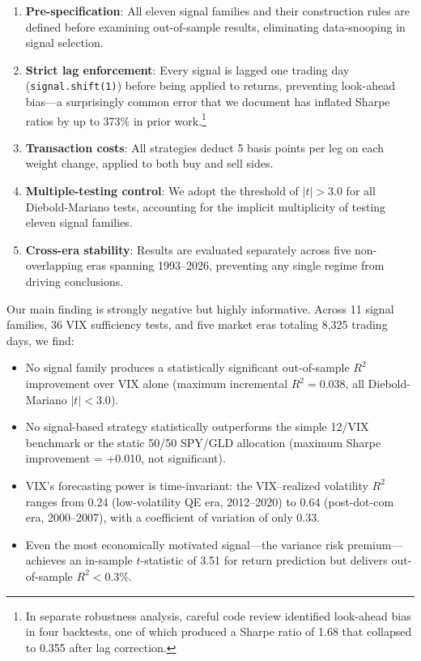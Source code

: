 \documentclass[12pt,a4paper]{article}
\begin{document}
\begin{enumerate}[label=(\roman*)]
    \item \textbf{Pre-specification}: All eleven signal families and their construction rules are defined before examining out-of-sample results, eliminating data-snooping in signal selection.
    \item \textbf{Strict lag enforcement}: Every signal is lagged one trading day (\texttt{signal.shift(1)}) before being applied to returns, preventing look-ahead bias---a surprisingly common error that we document has inflated Sharpe ratios by up to 373\% in prior work.\footnote{In separate robustness analysis, careful code review identified look-ahead bias in four backtests, one of which produced a Sharpe ratio of 1.68 that collapsed to 0.355 after lag correction.}
    \item \textbf{Transaction costs}: All strategies deduct 5 basis points per leg on each weight change, applied to both buy and sell sides.
    \item \textbf{Multiple-testing control}: We adopt the \citet{harvey2016} threshold of $|t| > 3.0$ for all Diebold-Mariano tests, accounting for the implicit multiplicity of testing eleven signal families.
    \item \textbf{Cross-era stability}: Results are evaluated separately across five non-overlapping eras spanning 1993--2026, preventing any single regime from driving conclusions.
\end{enumerate}

Our main finding is strongly negative but highly informative. Across 11 signal families, 36 VIX sufficiency tests, and five market eras totaling 8,325 trading days, we find:

\begin{itemize}
    \item No signal family produces a statistically significant out-of-sample $R^2$ improvement over VIX alone (maximum incremental $R^2 = 0.038$, all Diebold-Mariano $|t| < 3.0$).
    \item No signal-based strategy statistically outperforms the simple 12/VIX benchmark or the static 50/50 SPY/GLD allocation (maximum Sharpe improvement = +0.010, not significant).
    \item VIX's forecasting power is time-invariant: the VIX--realized volatility $R^2$ ranges from 0.24 (low-volatility QE era, 2012--2020) to 0.64 (post-dot-com era, 2000--2007), with a coefficient of variation of only 0.33.
    \item Even the most economically motivated signal---the variance risk premium---achieves an in-sample $t$-statistic of 3.51 for return prediction but delivers out-of-sample $R^2 < 0.3\%$.
\end{itemize}
\end{document}
